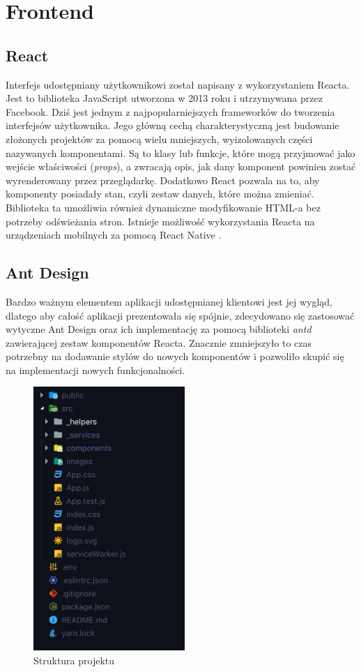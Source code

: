 \documentclass[declaration,shortabstract,polish,inz]{iithesis}
\begin{document}
\section{Frontend}

\subsection{React}
Interfejs udostępniany użytkownikowi został napisany z wykorzystaniem Reacta. Jest to biblioteka JavaScript utworzona w 2013 roku \cite{reactwiki} i utrzymywana przez Facebook. Dziś jest jednym z najpopularniejszych frameworków do tworzenia interfejsów użytkownika. Jego główną cechą charakterystyczną jest budowanie złożonych projektów za pomocą wielu mniejszych, wyizolowanych części nazywanych komponentami. Są to klasy lub funkcje, które mogą przyjmować jako wejście właściwości (\textit{props}), a zwracają opis, jak dany komponent powinien zostać wyrenderowany przez przeglądarkę. Dodatkowo React pozwala na to, aby komponenty posiadały stan, czyli zestaw danych, które można zmieniać. Biblioteka ta umożliwia również dynamiczne modyfikowanie HTML-a bez potrzeby odświeżania stron. Istnieje możliwość wykorzystania Reacta na urządzeniach mobilnych za pomocą React Native \cite{reactnative}.

\subsection{Ant Design}
Bardzo ważnym elementem aplikacji udostępnianej klientowi jest jej wygląd, dlatego aby całość aplikacji prezentowała się spójnie, zdecydowano się zastosować wytyczne Ant Design \cite{ant} oraz ich implementację za pomocą biblioteki \textit{antd} zawierającej zestaw komponentów Reacta. Znacznie zmniejszyło to czas potrzebny na dodawanie stylów do nowych komponentów i pozwoliło skupić się na implementacji nowych funkcjonalności.

\begin{figure}[H]
    \centering
    \includegraphics[height=10cm]{images/forontend.png}  
    \caption{Struktura projektu}
    \label{fig:frontend_struct}
\end{figure}
\end{document}
